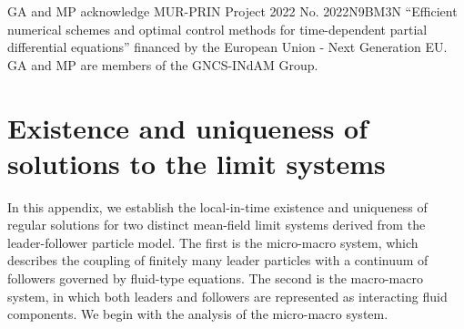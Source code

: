 \documentclass[10pt, reqno]{amsart}
\theoremstyle{definition}
\theoremstyle{remark}
\numberwithin{equation}{section}
\begin{document}
GA and MP acknowledge MUR-PRIN Project 2022 No. 2022N9BM3N ``Efficient numerical schemes and optimal control methods for time-dependent partial differential equations'' financed by the European Union - Next Generation EU. GA and MP are members of the GNCS-INdAM Group.

%
%
%                         
%
%





\appendix

%
%
%
%
%
\section{Existence and uniqueness of solutions to the limit systems}\label{app_existence}
In this appendix, we establish the local-in-time existence and uniqueness of regular solutions for two distinct mean-field limit systems derived from the leader-follower particle model. The first is the micro-macro system, which describes the coupling of finitely many leader particles with a continuum of followers governed by fluid-type equations. The second is the macro-macro system, in which both leaders and followers are represented as interacting fluid components. We begin with the analysis of the micro-macro system.
%
%
%
%
%
\end{document}
